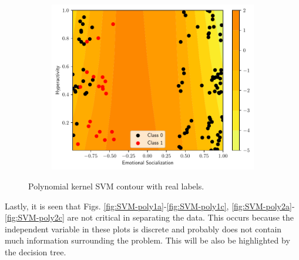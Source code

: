 \begin{figure}
\begin{subfigure}[b]{0.32\textwidth}
    \centering \includegraphics[width=\textwidth]{figs/svm-poly-contour-2-5.pdf}
    \caption{}
    \label{fig:SVM-poly3c}
  \end{subfigure}
  \caption{Polynomial kernel SVM contour with real labels.}
  \label{fig:SVM-poly}
\end{figure}

Lastly, it is seen that Figs. \ref{fig:SVM-poly1a}-\ref{fig:SVM-poly1c},
\ref{fig:SVM-poly2a}-\ref{fig:SVM-poly2c} are not critical in separating the
data. This occurs because the independent variable in these plots is discrete
and probably does not contain much information surrounding the problem. This
will be also be highlighted by the decision tree.

